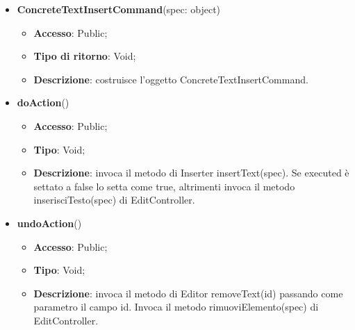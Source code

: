 {{{	
	\begin{itemize}
		\item \textbf{ConcreteTextInsertCommand}(spec: object)
		\begin{itemize}
			\item \textbf{Accesso}: Public;
			\item \textbf{Tipo di ritorno}: Void;
			\item \textbf{Descrizione}: costruisce l’oggetto ConcreteTextInsertCommand.
		\end{itemize}
		\item \textbf{doAction}()
		\begin{itemize}
			\item \textbf{Accesso}: Public;
			\item \textbf{Tipo}: Void;
			\item \textbf{Descrizione}: invoca il metodo di Inserter insertText(spec). Se executed è settato a false lo setta come true, altrimenti invoca il metodo inserisciTesto(spec) di EditController.
		\end{itemize}
		\item \textbf{undoAction}()
		\begin{itemize}
			\item \textbf{Accesso}: Public;
			\item \textbf{Tipo}: Void;
			\item \textbf{Descrizione}: invoca il metodo di Editor removeText(id) passando come parametro il campo id. Invoca il metodo rimuoviElemento(spec) di EditController.
		\end{itemize}
	\end{itemize}
	}
	
}}
